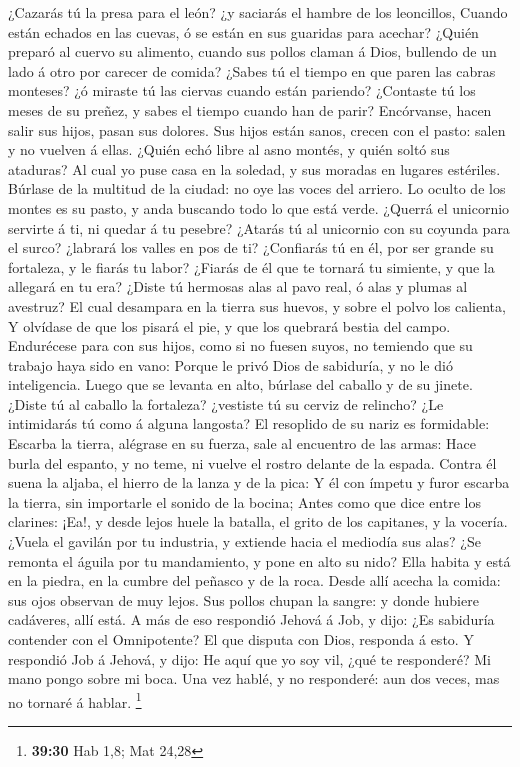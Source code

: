  ¿Cazarás tú la presa para el león? ¿y saciarás el hambre de
los leoncillos,  Cuando están echados en las cuevas, ó se
están en sus guaridas para acechar?  ¿Quién preparó al
cuervo su alimento, cuando sus pollos claman á Dios, bullendo de un lado
á otro por carecer de comida?  ¿Sabes tú el tiempo en que
paren las cabras monteses? ¿ó miraste tú las ciervas cuando están
pariendo?  ¿Contaste tú los meses de su preñez, y sabes el
tiempo cuando han de parir?  Encórvanse, hacen salir sus
hijos, pasan sus dolores.  Sus hijos están sanos, crecen con
el pasto: salen y no vuelven á ellas.  ¿Quién echó libre al
asno montés, y quién soltó sus ataduras?  Al cual yo puse
casa en la soledad, y sus moradas en lugares estériles. 
Búrlase de la multitud de la ciudad: no oye las voces del arriero.
 Lo oculto de los montes es su pasto, y anda buscando todo
lo que está verde.  ¿Querrá el unicornio servirte á ti, ni
quedar á tu pesebre?  ¿Atarás tú al unicornio con su
coyunda para el surco? ¿labrará los valles en pos de ti? 
¿Confiarás tú en él, por ser grande su fortaleza, y le fiarás tu labor?
 ¿Fiarás de él que te tornará tu simiente, y que la
allegará en tu era?  ¿Diste tú hermosas alas al pavo real,
ó alas y plumas al avestruz?  El cual desampara en la
tierra sus huevos, y sobre el polvo los calienta,  Y
olvídase de que los pisará el pie, y que los quebrará bestia del campo.
 Endurécese para con sus hijos, como si no fuesen suyos, no
temiendo que su trabajo haya sido en vano:  Porque le privó
Dios de sabiduría, y no le dió inteligencia.  Luego que se
levanta en alto, búrlase del caballo y de su jinete. 
¿Diste tú al caballo la fortaleza? ¿vestiste tú su cerviz de relincho?
 ¿Le intimidarás tú como á alguna langosta? El resoplido de
su nariz es formidable:  Escarba la tierra, alégrase en su
fuerza, sale al encuentro de las armas:  Hace burla del
espanto, y no teme, ni vuelve el rostro delante de la espada.
 Contra él suena la aljaba, el hierro de la lanza y de la
pica:  Y él con ímpetu y furor escarba la tierra, sin
importarle el sonido de la bocina;  Antes como que dice
entre los clarines: ¡Ea!, y desde lejos huele la batalla, el grito de
los capitanes, y la vocería.  ¿Vuela el gavilán por tu
industria, y extiende hacia el mediodía sus alas?  ¿Se
remonta el águila por tu mandamiento, y pone en alto su nido? Ella
habita y está en la piedra, en la cumbre del peñasco y de la roca. Desde
allí acecha la comida: sus ojos observan de muy lejos. Sus pollos chupan
la sangre: y donde hubiere cadáveres, allí está. A más de eso respondió
Jehová á Job, y dijo: ¿Es sabiduría contender con el Omnipotente? El que
disputa con Dios, responda á esto. Y respondió Job á Jehová, y dijo: He
aquí que yo soy vil, ¿qué te responderé? Mi mano pongo sobre mi boca.
Una vez hablé, y no responderé: aun dos veces, mas no tornaré á hablar.
\footnote{\textbf{39:30} Hab 1,8; Mat 24,28}

